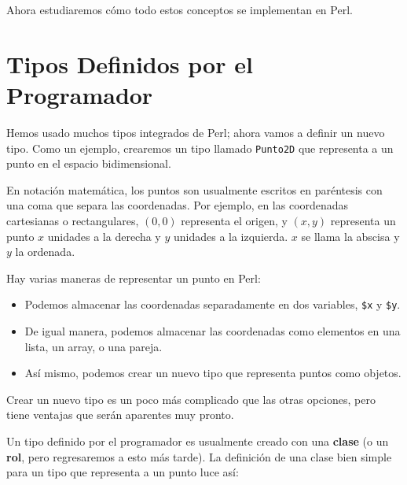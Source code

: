 Ahora estudiaremos cómo todo estos conceptos se implementan en Perl.


\section{Tipos Definidos por el Programador}
\label{point}

Hemos usado muchos tipos integrados de Perl; ahora vamos
a definir un nuevo tipo. Como un ejemplo, crearemos un
tipo llamado {\tt Punto2D} que representa a un punto en
el espacio bidimensional.

En notación matemática, los puntos son usualmente escritos
en paréntesis con una coma que separa las coordenadas.  Por 
ejemplo, en las coordenadas cartesianas o rectangulares,
$(0,0)$ representa el origen, y $(x,y)$ representa un punto
$x$ unidades a la derecha y $y$ unidades a la izquierda. $x$
se llama la abscisa y $y$ la ordenada.

Hay varias maneras de representar un punto en Perl:

\begin{itemize}

\item Podemos almacenar las coordenadas separadamente 
en dos variables, {\tt \$x} y {\tt \$y}.

\item De igual manera, podemos almacenar las coordenadas como
elementos en una lista, un array, o una pareja.

\item Así mismo, podemos crear un nuevo tipo que representa
puntos como objetos.

\end{itemize}

Crear un nuevo tipo es un poco más complicado que las otras
opciones, pero tiene ventajas que serán aparentes muy pronto.

Un tipo definido por el programador es usualmente creado con 
una {\bf clase} (o un {\bf rol}, pero regresaremos a esto más tarde).
La definición de una clase bien simple para un tipo que representa a 
un punto luce así:

